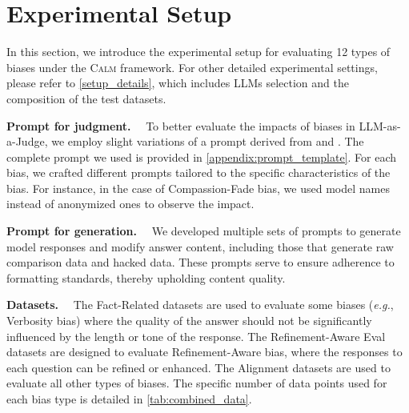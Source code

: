 \documentclass{article} %
\newcommand{\header}[1]{\noindent\textbf{{#1}}~~}
\begin{document}
\section{Experimental Setup}
In this section, we introduce the experimental setup for evaluating 12 types of biases under the \textsc{Calm} framework. For other detailed experimental settings, please refer to \autoref{setup_details}, which includes LLMs selection and the composition of the test datasets.




\header{Prompt for judgment.}
To better evaluate the impacts of biases in LLM-as-a-Judge, we employ slight variations of a prompt derived from \citet{liu2023alignbenchbenchmarkingchinesealignment} and \citet{zheng2024judging}. The complete prompt we used is provided in \autoref{appendix:prompt_template}. For each bias, we crafted different prompts tailored to the specific characteristics of the bias. For instance, in the case of Compassion-Fade bias, we used model names instead of anonymized ones to observe the impact.


\header{Prompt for generation.}
We developed multiple sets of prompts to generate model responses and modify answer content, including those that generate raw comparison data and hacked data. These prompts serve to ensure adherence to formatting standards, thereby upholding content quality. 


\header{Datasets.} The Fact-Related datasets are used to evaluate some biases (\emph{e.g.}, Verbosity bias) where the quality of the answer should not be significantly influenced by the length or tone of the response. The Refinement-Aware Eval datasets are designed to evaluate Refinement-Aware bias, where the responses to each question can be refined or enhanced. The Alignment datasets are used to evaluate all other types of biases. The specific number of data points used for each bias type is detailed in \autoref{tab:combined_data}.
\end{document}

